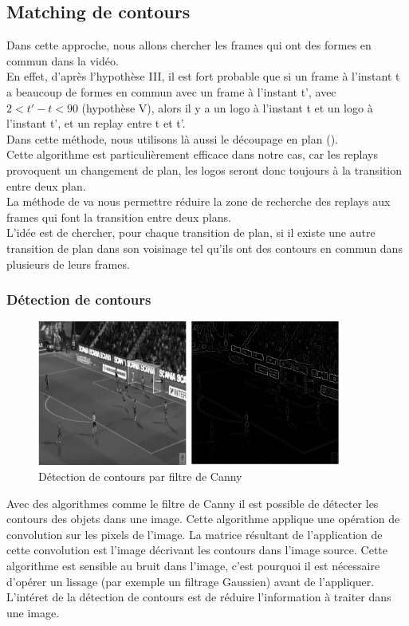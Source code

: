 \documentclass[11pt]{article}
\begin{document}
\subsection{Matching de contours}
\label{sec:orge4dcb1f}
Dans cette approche, nous allons chercher les frames qui ont des formes en commun dans la vidéo.\\
En effet, d'après l'hypothèse III, il est fort probable que si un frame à l'instant t a beaucoup de formes en commun avec un frame à l'instant t', avec \(2 < t' - t < 90\) (hypothèse V), alors il y a un logo à l'instant t et un logo à l'instant t', et un replay entre t et t'.\\

Dans cette méthode, nous utilisons là aussi le découpage en plan (\cite{Abd_Almageed_2008}).\\
Cette algorithme est particulièrement efficace dans notre cas, car les replays provoquent un changement de plan, les logos seront donc toujours à la transition entre deux plan.\\
La méthode de \cite{Abd_Almageed_2008} va nous permettre réduire la zone de recherche des replays aux frames qui font la transition entre deux plans.\\

L'idée est de chercher, pour chaque transition de plan, si il existe une autre transition de plan dans son voisinage tel qu'ils ont des contours en commun dans plusieurs de leurs frames.\\

\subsubsection{Détection de contours}
\label{sec:org7e9ef2c}
\begin{figure}[htbp]
\centering
\includegraphics[width=10cm]{canny_edge2.png}
\caption{Détection de contours par filtre de Canny}
\end{figure}
Avec des algorithmes comme le filtre de Canny il est possible de détecter les contours des objets dans une image. Cette algorithme applique une opération de convolution sur les pixels de l'image. La matrice résultant de l'application de cette convolution est l'image décrivant les contours dans l'image source. Cette algorithme est sensible au bruit dans l'image, c'est pourquoi il est nécessaire d'opérer un lissage (par exemple un filtrage Gaussien) avant de l'appliquer.\\
L'intéret de la détection de contours est de réduire l'information à traiter dans une image.\\
\end{document}
